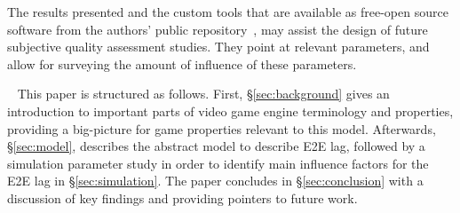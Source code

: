 The results presented and the custom tools that are available as free-open source software from the authors' public repository~\cite{onlinegame-lag-sim-repo}, may assist the design of future subjective quality assessment studies. They point at relevant parameters, and allow for surveying the amount of influence of these parameters.


~\newline
This paper is structured as follows. First, §\ref{sec:background} gives an introduction to important parts of video game engine terminology and properties, providing a big-picture for game properties relevant to this model. Afterwards, §\ref{sec:model}, describes the abstract model to describe \gls{E2E} lag, followed by a simulation parameter study in order to identify main influence factors for the \gls{E2E} lag in §\ref{sec:simulation}. The paper concludes in §\ref{sec:conclusion} with a discussion of key findings and providing pointers to future work.




